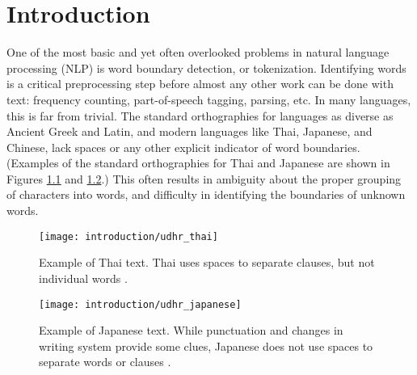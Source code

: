 \chapter{Introduction}

One of the most basic and yet often overlooked problems in natural language processing (NLP) is word boundary detection, or tokenization. Identifying words is a critical preprocessing step before almost any other work can be done with text: frequency counting, part-of-speech tagging, parsing, etc.
In many languages, this is far from trivial. The standard orthographies for languages as diverse as Ancient Greek and Latin, and modern languages like Thai, Japanese, and Chinese, lack spaces or any other explicit indicator of word boundaries. (Examples of the standard orthographies for Thai and Japanese are shown in Figures \ref{thaitext} and \ref{jpntext}.) This often results in ambiguity about the proper grouping of characters into words, and difficulty in identifying the boundaries of unknown words.

\begin{figure}
	\begin{center}
		\texttt{[image: introduction/udhr\_thai]}
		\caption[Example of Thai Text]{Example of Thai text. Thai uses spaces to separate clauses, but not individual words \cite{omnithai}.}
		\label{thaitext}
	\end{center}
\end{figure}

\begin{figure}
	\begin{center}
		\texttt{[image: introduction/udhr\_japanese]}
		\caption[Example of Japanese Text]{Example of Japanese text. While punctuation and changes in writing system provide some clues, Japanese does not use spaces to separate words or clauses \cite{omnijpn}.}
		\label{jpntext}
	\end{center}
\end{figure}

